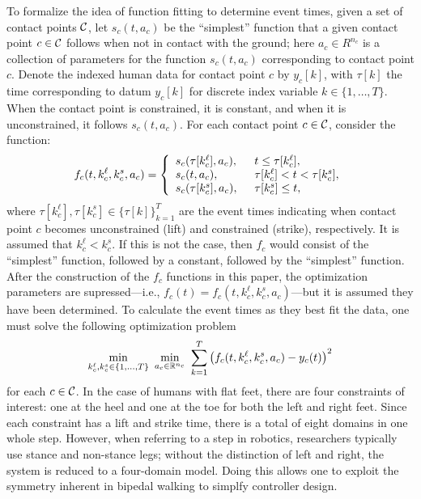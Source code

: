 To formalize the idea of function fitting to determine event times, given a set
of contact points $\mathcal{C}$, let $s_{c}(t, a_{c})$ be the ``simplest'' function that
a given contact point $c \in \mathcal{C}$ follows when not in contact with the ground;
%
here $a_{c} \in R^{n_{c}}$ is a collection of parameters for the function
$s_{c}(t, a_{c})$ corresponding to contact point $c$.
%
Denote the indexed human data for contact point $c$ by $y_{c}[k]$, with
$\tau[k]$ the time corresponding to datum $y_{c}[k]$ for discrete index variable
$k \in \{1,\ldots,T\}$.
%
When the contact point is constrained, it is constant, and when it is
unconstrained, it follows $s_{c}(t, a_{c})$.
%
For each contact point $c \in \mathcal{C}$, consider the function:
%
\begin{align*}
  f_{c}(t, k_{c}^{\ell}, k_{c}^{s}, a_{c}) =  \left\{\begin{array}{l l}
      s_{c}(\tau[k_{c}^{\ell}], a_{c}), & \hspace{2mm} t \leq  \tau[k_{c}^{\ell}],\\
      s_{c}(t, a_{c}), & \hspace{2mm} \tau[k_{c}^{\ell}] < t < \tau[k_{c}^{s}],\\
      s_{c}(\tau[k_{c}^{s}], a_{c}), & \hspace{2mm} \tau[k_{c}^{s}] \leq t,\\
  \end{array} \right.
\end{align*}
where $\tau[k_{c}^{\ell}], \tau[k_{c}^{s}] \in \{\tau[k]\}_{k = 1}^{T}$ are the
event times indicating when contact point $c$ becomes unconstrained (lift) and
constrained (strike), respectively.
%
It is assumed that $k_{c}^{\ell} < k_{c}^{s}$.
%
If this is not the case, then $f_{c}$ would consist of the ``simplest''
function, followed by a constant, followed by the ``simplest'' function.
%
After the construction of the $f_{c}$ functions in this paper, the optimization
parameters are supressed---i.e., $f_{c}(t) = f_{c}(t, k_{c}^{\ell}, k_{c}^{s},
a_{c})$---but it is assumed they have been determined.
%
To calculate the event times as they best fit the data, one must solve the following optimization problem
\begin{align*}
  \min_{k_{c}^{\ell}, k_{c}^{s} \in \{1, \ldots, T\}} \ \min_{a_{c} \in
    \mathbb{R}^{n_{c}}} \ \sum_{k = 1}^{T} \left( f_{c}(t,k_{c}^{\ell},k_{c}^{s},a_{c})
    - y_{c}(t) \right)^2
\end{align*}
for each $c \in \mathcal{C}$.
%
In the case of humans with flat feet, there are four constraints of interest:
%
one at the heel and one at the toe for both the left and right feet.
%
Since each constraint has a lift and strike time, there is a total of eight
domains in one whole step.
%
However, when referring to a step in robotics, researchers typically use stance
and non-stance legs;
%
without the distinction of left and right, the system is reduced to a
four-domain model.
%
Doing this allows one to exploit the symmetry inherent in bipedal walking to
simplfy controller design.

